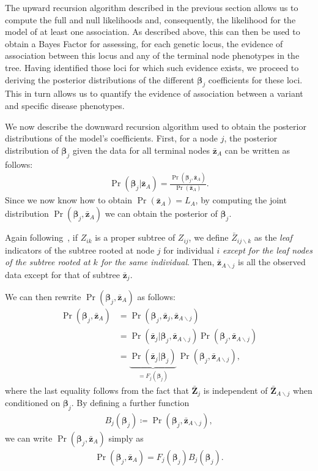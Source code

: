 \documentclass[10pt]{article}
\newcommand{\B}{\symbf{\beta}}
\newcommand{\bz}{\bar{\symbf{z}}}
\newcommand{\ssm}{\smallsetminus}
\begin{document}
The upward recursion algorithm described in the previous section allows us to compute the full and null likelihoods and, consequently, the likelihood for the model of at least one association. As described above, this can then be used to obtain a Bayes Factor for assessing, for each genetic locus, the evidence of association between this locus and any of the terminal node phenotypes in the tree. Having identified those loci for which such evidence exists, we proceed to deriving the posterior distributions of the different $\B_j$ coefficients for these loci. This in turn allows us to quantify the evidence of association between a variant and specific disease phenotypes.


We now describe the downward recursion algorithm used to obtain the posterior distributions of the model's coefficients. First, for a node $j$, the posterior distribution of $\B_j$ given the data for all terminal nodes $\bz_A$ can be written as follows:
\begin{align}
  \Pr(\B_j | \bz_A) = \frac{\Pr(\B_j, \bz_A)}{\Pr(\bz_A)}. \label{eq:post}
\end{align}
Since we now know how to obtain $\Pr(\bz_A)=L_A$, by computing the joint distribution $\Pr(\B_j, \bz_A)$ we can obtain the posterior of $\B_j$.


Again following~\cite{Durand2004}, if $Z_{ik}$ is a proper subtree of $Z_{ij}$, we define $\bar{Z}_{ij\ssm k}$ as the \textit{leaf} indicators of the subtree rooted at node $j$ for individual $i$ \textit{except for the leaf nodes of the subtree rooted at $k$ for the same individual}. Then, $\bz_{A\ssm j}$ is all the observed data except for that of subtree $\bz_j$.


We can then rewrite $\Pr(\B_j, \bz_A)$ as follows:
\begin{align}
  \Pr(\B_j, \bz_A) &= \Pr(\B_j, \bz_j, \bz_{A\ssm j})\nonumber\\
  &= \Pr(\bz_j | \B_j, \bz_{A\ssm j}) \Pr(\B_j, \bz_{A\ssm j})\nonumber\\
  &= \underbrace{\Pr(\bz_j | \B_j)}_{=F_j(\B_j)} \, \Pr(\B_j, \bz_{A\ssm j}), \label{eq:pbz}
\end{align}
where the last equality follows from the fact that $\bar{\symbf{Z}}_j$ is independent of $\bar{\symbf{Z}}_{A\ssm j}$ when conditioned on $\B_j$. By defining a further function
\begin{align*}
  B_j(\B_j) \coloneqq \Pr(\B_j, \bz_{A\ssm j}),
\end{align*}
we can write $\Pr(\B_j, \bz_A)$ simply as
\begin{align}
  \Pr(\B_j, \bz_A) = F_j(\B_j) B_j(\B_j). \label{eq:B1}
\end{align}
\end{document}
